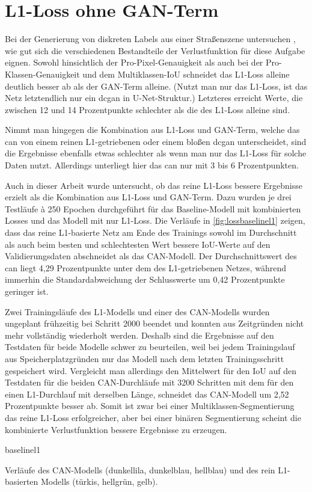 \section{L1-Loss ohne GAN-Term}

Bei der Generierung von diskreten Labels aus einer Straßenszene untersuchen \citeauthor{Isola.2017}, wie gut sich die verschiedenen Bestandteile der Verlustfunktion für diese Aufgabe eignen.
Sowohl hinsichtlich der Pro-Pixel-Genauigkeit als auch bei der Pro-Klassen-Genauigkeit und dem Multiklassen-IoU schneidet das L1-Loss alleine deutlich besser ab als der GAN-Term alleine.
(Nutzt man nur das L1-Loss, ist das Netz letztendlich nur ein \gls{dcgan} in U-Net-Struktur.)
Letzteres erreicht Werte, die zwischen 12 und 14 Prozentpunkte schlechter als die des L1-Loss alleine sind.

Nimmt man hingegen die Kombination aus L1-Loss und GAN-Term, welche das \gls{can} von einem reinen L1-getriebenen oder einem bloßen \gls{dcgan} unterscheidet, sind die Ergebnisse ebenfalls etwas schlechter als wenn man nur das L1-Loss für solche Daten nutzt.
Allerdings unterliegt hier das \gls{can} nur mit 3 bis 6 Prozentpunkten.

Auch in dieser Arbeit wurde untersucht, ob das reine L1-Loss bessere Ergebnisse erzielt als die Kombination aus L1-Loss und GAN-Term.
Dazu wurden je drei Testläufe à 250 Epochen durchgeführt für das Baseline-Modell mit kombinierten Losses und das Modell mit nur L1-Loss.
Die Verläufe in \autoref{fig:lossbaselinel1} zeigen, dass das reine L1-basierte Netz am Ende des Trainings sowohl im Durchschnitt als auch beim besten und schlechtesten Wert bessere IoU-Werte auf den Validierungsdaten abschneidet als das CAN-Modell.
Der Durchschnittswert des \gls{can} liegt 4,29 Prozentpunkte unter dem des L1-getriebenen Netzes, während immerhin die Standardabweichung der Schlusswerte um 0,42 Prozentpunkte geringer ist.

Zwei Trainingsläufe des L1-Modells und einer des CAN-Modells wurden ungeplant frühzeitig bei Schritt 2000 beendet und konnten aus Zeitgründen nicht mehr vollständig wiederholt werden.
Deshalb sind die Ergebnisse auf den Testdaten für beide Modelle schwer zu beurteilen, weil bei jedem Trainingslauf aus Speicherplatzgründen nur das Modell nach dem letzten Trainingsschritt gespeichert wird.
Vergleicht man allerdings den Mittelwert für den IoU auf den Testdaten für die beiden CAN-Durchläufe mit 3200 Schritten mit dem für den einen L1-Durchlauf mit derselben Länge, schneidet das CAN-Modell um 2,52 Prozentpunkte besser ab.
Somit ist zwar bei einer Multiklassen-Segmentierung das reine L1-Loss erfolgreicher, aber bei einer binären Segmentierung scheint die kombinierte Verlustfunktion bessere Ergebnisse zu erzeugen.

\begin{losses}{baselinel1}
	\caption[Verläufe des CAN-Modells und des rein L1-basierten Modells]{Verläufe des CAN-Modells (dunkellila, dunkelblau, hellblau) und des rein L1-basierten Modells (türkis, hellgrün, gelb).}
	\label{fig:lossbaselinel1}
\end{losses}
